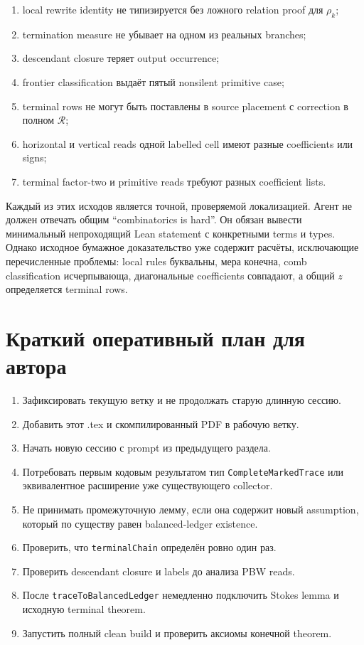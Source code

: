 \documentclass[11pt,a4paper]{article}
\theoremstyle{definition}
\theoremstyle{remark}
\newcommand{\Rel}{\mathcal R}
\begin{document}
\begin{enumerate}
\item local rewrite identity не типизируется без ложного relation proof для
$\rho_k$;
\item termination measure не убывает на одном из реальных branches;
\item descendant closure теряет output occurrence;
\item frontier classification выдаёт пятый nonsilent primitive case;
\item terminal rows не могут быть поставлены в source placement с correction
в полном $\Rel$;
\item horizontal и vertical reads одной labelled cell имеют разные
coefficients или signs;
\item terminal factor-two и primitive reads требуют разных coefficient lists.
\end{enumerate}

Каждый из этих исходов является точной, проверяемой локализацией. Агент не
должен отвечать общим ``combinatorics is hard''. Он обязан вывести минимальный
непроходящий Lean statement с конкретными terms и types. Однако исходное
бумажное доказательство уже содержит расчёты, исключающие перечисленные
проблемы: local rules буквальны, мера конечна, comb classification исчерпывающа,
диагональные coefficients совпадают, а общий $z$ определяется terminal rows.

\section{Краткий оперативный план для автора}

\begin{enumerate}
\item Зафиксировать текущую ветку и не продолжать старую длинную сессию.
\item Добавить этот .tex и скомпилированный PDF в рабочую ветку.
\item Начать новую сессию с prompt из предыдущего раздела.
\item Потребовать первым кодовым результатом тип \texttt{CompleteMarkedTrace} или
эквивалентное расширение уже существующего collector.
\item Не принимать промежуточную лемму, если она содержит новый assumption,
который по существу равен balanced-ledger existence.
\item Проверить, что \texttt{terminalChain} определён ровно один раз.
\item Проверить descendant closure и labels до анализа PBW reads.
\item После \texttt{traceToBalancedLedger} немедленно подключить Stokes lemma и
исходную terminal theorem.
\item Запустить полный clean build и проверить аксиомы конечной theorem.
\end{enumerate}
\end{document}
